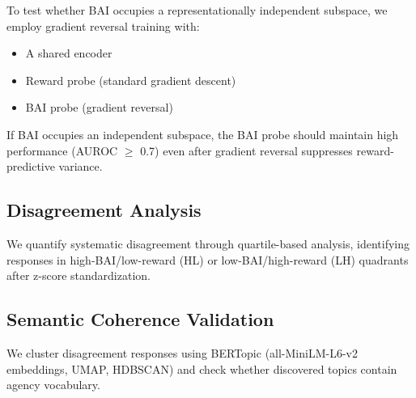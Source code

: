 To test whether BAI occupies a representationally independent subspace, we employ gradient reversal training with:
\begin{itemize}
    \item A shared encoder
    \item Reward probe (standard gradient descent)
    \item BAI probe (gradient reversal)
\end{itemize}

If BAI occupies an independent subspace, the BAI probe should maintain high performance (AUROC $\geq$ 0.7) even after gradient reversal suppresses reward-predictive variance.

\subsection{Disagreement Analysis}

We quantify systematic disagreement through quartile-based analysis, identifying responses in high-BAI/low-reward (HL) or low-BAI/high-reward (LH) quadrants after z-score standardization.

\subsection{Semantic Coherence Validation}

We cluster disagreement responses using BERTopic (all-MiniLM-L6-v2 embeddings, UMAP, HDBSCAN) and check whether discovered topics contain agency vocabulary.

